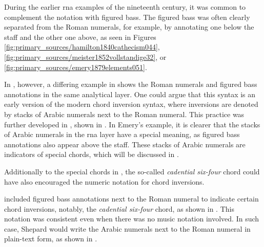 
During the earlier \gls{rna} examples of the nineteenth
century, it was common to complement the notation with
figured bass. The figured bass was often clearly separated
from the Roman numerals, for example, by annotating one
below the staff and the other one above, as seen in Figures
\ref{fig:primary_sources/hamilton1840cathecism044},
\ref{fig:primary_sources/meister1852vollstandige32}, or
\ref{fig:primary_sources/emery1879elements051}.

In ,
however, a differing example in
\textcite{bussler1878praktische} shows the Roman numerals
and figured bass annotations in the same analytical layer.
One could argue that this syntax is an early version of the
modern chord inversion syntax, where inversions are denoted
by stacks of Arabic numerals next to the Roman numeral. This
practice was further developed in
\textcite{emery1879elements}, shown in
. In Emery's
example, it is clearer that the stacks of Arabic numerals in
the \gls{rna} layer have a special meaning, as figured bass
annotations also appear above the staff. These stacks of
Arabic numerals are indicators of special chords, which will
be discussed in
.



Additionally to the special chords in
\textcite{emery1879elements}, the so-called \emph{cadential
six-four} chord could have also encouraged the numeric
notation for chord inversions.

\textcite{shepard1896harmony} included figured bass
annotations next to the Roman numeral to indicate certain
chord inversions, notably, the \emph{cadential six-four}
chord, as shown in
. This
notation was consistent even when there was no music
notation involved. In such case, Shepard would write the
Arabic numerals next to the Roman numeral in plain-text
form, as shown in
.

